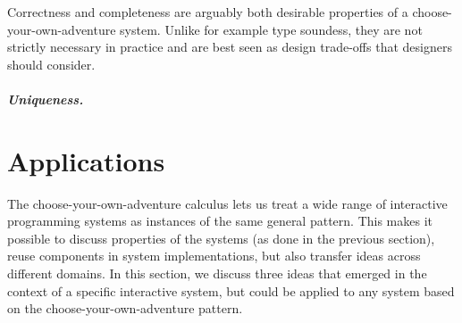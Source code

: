 \documentclass[a4paper,UKenglish,cleveref, autoref, thm-restate]{lipics-v2021}
\begin{document}
Correctness and completeness are arguably both desirable properties of a choose-your-own-adventure
system. Unlike for example type soundess, they are not strictly necessary in practice and are best
seen as design trade-offs that designers should consider.

\subparagraph{Uniqueness.}

\section{Applications}
\label{sec:applications}

The choose-your-own-adventure calculus lets us treat a wide range of interactive programming
systems as instances of the same general pattern. This makes it possible to discuss properties
of the systems (as done in the previous section), reuse components in system implementations,
but also transfer ideas across different domains. In this section, we discuss three ideas that
emerged in the context of a specific interactive system, but could be applied to any system
based on the choose-your-own-adventure pattern.

~
\end{document}
